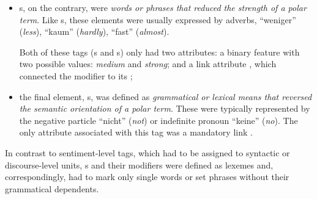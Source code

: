\begin{itemize}
\item
  \textbf{}s, on the contrary, were \emph{words
    or phrases that reduced the strength of a polar term}.  Like
  s, these elements were usually expressed by
  adverbs, \eg{} ``weniger'' (\emph{less}), ``kaum'' (\emph{hardly}),
  ``fast'' (\emph{almost}).

  Both of these tags (s and
  s) only had two attributes: a binary feature
   with two possible values: \emph{medium} and
  \emph{strong}; and a link attribute ,
  which connected the modifier to its ;

\item the final element, \textbf{}s, was defined as
  \emph{grammatical or lexical means that reversed the semantic
    orientation of a polar term}.  These were typically represented by
  the negative particle ``nicht'' (\emph{not}) or indefinite pronoun
  ``keine'' (\emph{no}).  The only attribute associated with this tag
  was a mandatory link .
\end{itemize}

In contrast to sentiment-level tags, which had to be assigned to
syntactic or discourse-level units, s and their
modifiers were defined as lexemes and, correspondingly, had to mark
only single words or set phrases without their grammatical dependents.

